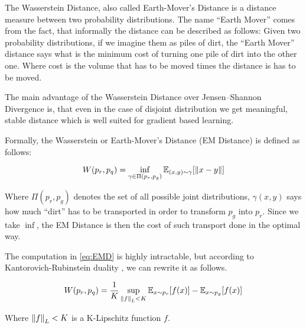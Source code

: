 The Wasserstein Distance, also called Earth-Mover's Distance is a distance
measure between two probability distributions. The name ``Earth Mover'' comes
from the fact, that informally the distance can be described as follows: Given
two probability distributions, if we imagine them as piles of dirt, the ``Earth
Mover'' distance says what is the minimum cost of turning one pile of dirt into the
other one. Where cost is the volume that has to be moved times the distance is
has to be moved.

The main advantage of the Wasserstein Distance over Jensen–Shannon Divergence is,
that even in the case of disjoint distribution we get meaningful, stable
distance which is well suited for gradient based learning.

Formally, the Wasserstein or Earth-Mover's Distance (EM Distance) is defined as
follows:

\begin{equation}
  \label{eq:EMD}
  W(p_r, p_q) = \inf_{\gamma \in \Pi(p_r, p_g)} \mathbb{E}_{(x, y) \sim \gamma}[\left\lVert x-y\right\rVert]
\end{equation}

Where $\Pi(p_r, p_g)$ denotes the set of all possible joint distributions,
$\gamma(x,y)$ says how much ``dirt'' has to be transported in order to transform
$p_g$ into $p_r$. Since we take $\inf$, the EM Distance is then the cost of such
transport done in the optimal way. 

The computation in \ref{eq:EMD} is highly intractable, but according to
Kantorovich-Rubinstein duality \cite{villani@optimal}, we can rewrite it as
follows.

\begin{equation}
  \label{eq:EMD}
  W(p_r, p_q) = \frac{1}{K} \sup_{\left\lVert f\right\rVert_L < K} \mathbb{E}_{x \sim p_r}[f(x)] - \mathbb{E}_{x \sim p_g}[f(x)]
\end{equation}

Where $\left\lVert f\right\rVert_L < K$ is a K-Lipschitz function $f$.





